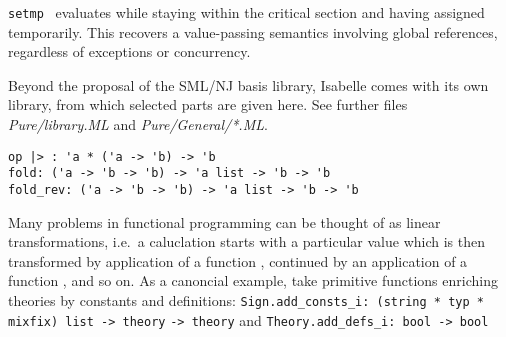 \begin{isabellebody}
\begin{isamarkuptext}
\begin{description}
  \item \verb|setmp|~ evaluates 
  while staying within the critical section and having  assigned temporarily.  This recovers a value-passing
  semantics involving global references, regardless of exceptions or
  concurrency.

  \end{description}%
\end{isamarkuptext}%
\isamarkuptrue%
%
\endisatagmlref
{\isafoldmlref}%
%
\isadelimmlref
%
\endisadelimmlref
%
\isamarkuptrue%
%
\begin{isamarkuptext}%
Beyond the proposal of the SML/NJ basis library, Isabelle comes
  with its own library, from which selected parts are given here.
  See further files \emph{Pure/library.ML} and \emph{Pure/General/*.ML}.%
\end{isamarkuptext}%
\isamarkuptrue%
%
\isamarkuptrue%
%
\isadelimmlref
%
\endisadelimmlref
%
\isatagmlref
%
\begin{isamarkuptext}%
\begin{mldecls}
  \verb|op |\verb,|,\verb|> : 'a * ('a -> 'b) -> 'b| \\
  \verb|fold: ('a -> 'b -> 'b) -> 'a list -> 'b -> 'b| \\
  \verb|fold_rev: ('a -> 'b -> 'b) -> 'a list -> 'b -> 'b| \\
  \end{mldecls}%
\end{isamarkuptext}%
\isamarkuptrue%
%
\endisatagmlref
{\isafoldmlref}%
%
\isadelimmlref
%
\endisadelimmlref
%
\isadelimML
%
\endisadelimML
%
\isatagML
%
\endisatagML
{\isafoldML}%
%
\isadelimML
%
\endisadelimML
%
\begin{isamarkuptext}%
Many problems in functional programming can be thought of
  as linear transformations, i.e.~a caluclation starts with a
  particular value  which is then transformed
  by application of a function ,
  continued by an application of a function ,
  and so on.  As a canoncial example, take primitive functions enriching
  theories by constants and definitions:
  \verb|Sign.add_consts_i: (string * typ * mixfix) list -> theory|\isasep\isanewline%
\verb|-> theory|
  and \verb|Theory.add_defs_i: bool -> bool|\isasep\isanewline%

\end{isamarkuptext}
\end{isabellebody}
